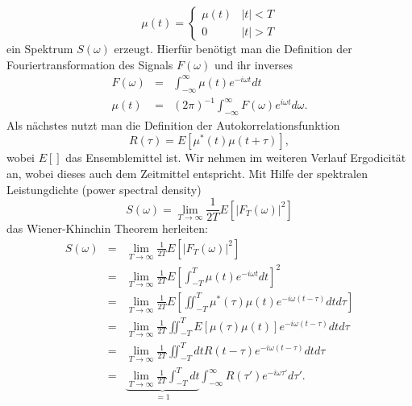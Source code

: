 \documentclass[a4paper,12pt]{article}
\begin{document}
  \begin{equation}
   \mu(t) = \left\{ 
         \begin{matrix}
          \mu(t) &  |t| < T\\
               0 &  |t| > T
         \end{matrix} 
         \right .
  \end{equation}
ein Spektrum $S(\omega)$ erzeugt. Hierfür benötigt man die Definition der Fouriertransformation des Signals $F(\omega)$ und ihr inverses 
  \begin{eqnarray}
   F(\omega)&=&             \int_{-\infty}^{\infty} \mu(t) e^{-i\omega t} dt\\
   \mu(t)   &=& (2\pi)^{-1} \int_{-\infty}^{\infty} F(\omega) e^{i\omega t} d\omega.
  \end{eqnarray}
Als nächstes nutzt man die Definition der Autokorrelationsfunktion 
  \begin{equation}
   R(\tau)=E[\mu^*(t) \mu(t+\tau)],
  \end{equation}
wobei $E[]$ das Ensemblemittel ist. Wir nehmen im weiteren Verlauf Ergodicität an, wobei dieses auch dem Zeitmittel entspricht. 
Mit Hilfe der spektralen Leistungdichte (power spectral density) 
  \begin{equation}\label{preKWT}
   S(\omega) = \lim_{T\rightarrow\infty} \frac{1}{2T} E[|F_T(\omega)|^2]
  \end{equation}
das Wiener-Khinchin Theorem herleiten:
  \begin{eqnarray}
      S(\omega)          &=& \lim_{T\rightarrow\infty} \frac{1}{2T} E[|F_T(\omega)|^2]\nonumber\\
                         &=& \lim_{T\rightarrow\infty} \frac{1}{2T}E\left[ \int_{-T}^T \mu(t) e^{-i\omega t} dt \right]^2  \nonumber\\
                         &=& \lim_{T\rightarrow\infty} \frac{1}{2T}E\left[ \iint_{-T}^T \mu^*(\tau)\mu(t) e^{-i\omega (t-\tau)}  dtd\tau \right]  \nonumber\\     
                         &=& \lim_{T\rightarrow\infty} \frac{1}{2T}        \iint_{-T}^T E[\mu(\tau)\mu(t)] e^{-i\omega (t-\tau)}  dtd\tau       \nonumber \\
                         &=& \lim_{T\rightarrow\infty} \frac{1}{2T} \iint_{-T}^T dt R(t-\tau) e^{-i\omega(t-\tau)} dtd\tau       \nonumber \\
                         &=&\underbrace{ \lim_{T\rightarrow\infty} \frac{1}{2T} \int_{-T}^T dt}_{=1} \int_{-\infty}^{\infty} R(\tau') e^{-i\omega\tau'} d\tau'. \label{WKT_tmp} 
  \end{eqnarray}
\end{document}
